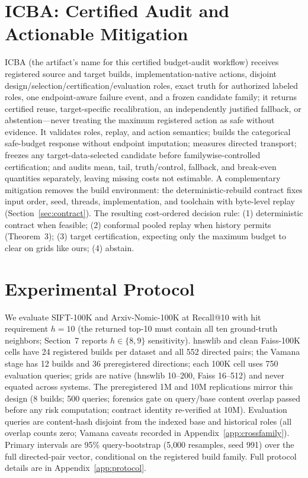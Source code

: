 \documentclass{article}
\begin{document}
\section{ICBA: Certified Audit and Actionable Mitigation}
\label{sec:icba}

ICBA (the artifact's name for this certified budget-audit workflow) receives registered source and target
builds, implementation-native actions, disjoint
design/selection/certification/evaluation roles, exact truth for authorized labeled roles, one
endpoint-aware failure event, and a frozen candidate family; it returns certified reuse, target-specific
recalibration, an independently justified fallback, or abstention---never treating the maximum registered
action as safe without evidence. It validates roles, replay, and action semantics; builds the categorical
safe-budget response without endpoint imputation; measures directed transport; freezes any
target-data-selected candidate before familywise-controlled certification; and audits mean, tail,
truth/control, fallback, and break-even quantities separately, leaving missing costs not estimable. A
complementary mitigation removes the build environment: the deterministic-rebuild contract fixes input
order, seed, threads, implementation, and toolchain with byte-level replay (Section~\ref{sec:contract}).
The resulting cost-ordered decision rule: (1) deterministic contract when feasible; (2) conformal pooled
replay when history permits (Theorem~3); (3) target certification, expecting only the maximum budget to
clear on grids like ours; (4) abstain.

\section{Experimental Protocol}
\label{sec:protocol}

We evaluate SIFT-100K and Arxiv-Nomic-100K at Recall@10 with hit requirement $h{=}10$ (the returned
top-10 must contain all ten ground-truth neighbors; Section~7 reports $h\in\{8,9\}$ sensitivity). hnswlib and clean Faiss-100K cells have 24 registered builds per dataset and all 552
directed pairs; the Vamana stage has 12 builds and 36 preregistered directions; each 100K cell uses 750
evaluation queries; grids are native (hnswlib 10--200, Faiss 16--512) and never equated across systems.
The preregistered 1M and 10M replications mirror this design (8 builds; 500 queries; forensics gate on
query/base content overlap passed before any risk computation; contract identity re-verified at 10M).
Evaluation queries are content-hash disjoint from the indexed base and historical roles (all overlap
counts zero; Vamana caveats recorded in Appendix~\ref{app:crossfamily}). Primary intervals are 95\%
query-bootstrap (5{,}000 resamples, seed 991) over the full directed-pair vector, conditional on the
registered build family. Full protocol details are in Appendix~\ref{app:protocol}.
\end{document}
